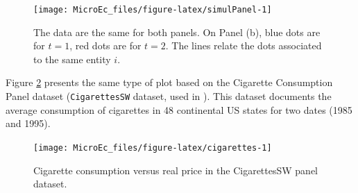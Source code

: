 \documentclass[
  12pt,
]{book}
\theoremstyle{definition}
\theoremstyle{definition}
\theoremstyle{definition}
\theoremstyle{definition}
\theoremstyle{remark}
\begin{document}
\begin{figure}
\texttt{[image: MicroEc\_files/figure-latex/simulPanel-1]} \caption{The data are the same for both panels. On Panel (b), blue dots are for $t=1$, red dots are for $t=2$. The lines relate the dots associated to the same entity $i$.}\label{fig:simulPanel}
\end{figure}

Figure \ref{fig:cigarettes} presents the same type of plot based on the Cigarette Consumption Panel dataset (\texttt{CigarettesSW} dataset, used in \citet{Stock_Watson_2003}). This dataset documents the average consumption of cigarettes in 48 continental US states for two dates (1985 and 1995).

\begin{figure}
\texttt{[image: MicroEc\_files/figure-latex/cigarettes-1]} \caption{Cigarette consumption versus real price in the CigarettesSW panel dataset.}\label{fig:cigarettes}
\end{figure}
\end{document}
